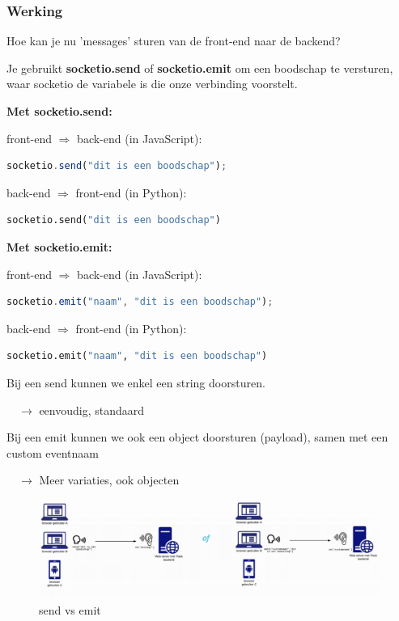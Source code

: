 \documentclass{article}
\newcommand{\bold}[1]{\textbf{#1}}
\begin{document}
\subsubsection{Werking}
Hoe kan je nu 'messages' sturen van de front-end naar de backend?

Je gebruikt \bold{socketio.send} of \bold{socketio.emit} om een boodschap te versturen,
waar socketio de variabele is die onze verbinding voorstelt.

\bold{Met socketio.send:}

front-end $\Rightarrow$ back-end (in JavaScript):
\begin{lstlisting}[language=Javascript]
socketio.send("dit is een boodschap");
\end{lstlisting}

back-end $\Rightarrow$ front-end (in Python):
\begin{lstlisting}[language=Python]
socketio.send("dit is een boodschap")
\end{lstlisting}

\bold{Met socketio.emit:}

front-end $\Rightarrow$ back-end (in JavaScript):
\begin{lstlisting}[language=Javascript]
socketio.emit("naam", "dit is een boodschap");
\end{lstlisting}

back-end $\Rightarrow$ front-end (in Python):
\begin{lstlisting}[language=Python]
socketio.emit("naam", "dit is een boodschap")
\end{lstlisting}

Bij een send kunnen we enkel een string doorsturen.

$\quad\rightarrow$ eenvoudig, standaard

Bij een emit kunnen we ook een object doorsturen (payload), samen met een custom eventnaam

$\quad\rightarrow$ Meer variaties, ook objecten


\begin{figure}[H]
    \centering
    \includegraphics[width=\textwidth]{img/Screenshot_20200420_090800.png} 
    \caption{send vs emit}   
\end{figure}
\end{document}
